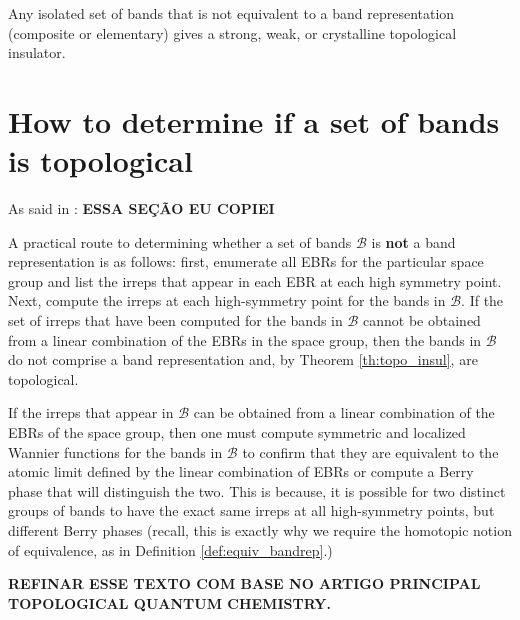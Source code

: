 \begin{theorem} \label{th:topo_insul}
Any isolated set of bands that is not equivalent to a band representation (composite or elementary) gives a strong, weak, or crystalline topological insulator.
\end{theorem}


\section{How to determine if a set of bands is topological}

As said in \cite{building_blocks2018}: \textbf{ESSA SEÇÃO EU COPIEI}

A practical route to determining whether a set of bands $\mathcal{B}$ is \textbf{not} a band representation is as follows: first, enumerate all EBRs for the particular space group and list the irreps that appear in each EBR at each high symmetry point. Next, compute the irreps at each high-symmetry point for the bands in $\mathcal{B}$. If the set of irreps that have been computed for the bands in $\mathcal{B}$ cannot be obtained from a linear combination of the EBRs in the space group, then the bands in $\mathcal{B}$ do not comprise a band representation and, by Theorem \ref{th:topo_insul}, are topological.

If the irreps that appear in $\mathcal{B}$ can be obtained from a linear combination of the EBRs of the space group, then one must compute symmetric and localized Wannier functions for the bands in $\mathcal{B}$ to confirm that they are equivalent to the atomic limit defined by the linear combination of EBRs or compute a Berry phase that will distinguish the two. This is because, it is possible for two distinct groups of bands to have the exact same irreps at all high-symmetry points, but different Berry phases (recall, this is exactly why we require the homotopic notion of equivalence, as in Definition \ref{def:equiv_bandrep}.)


\n\n

\textbf{REFINAR ESSE TEXTO COM BASE NO ARTIGO PRINCIPAL TOPOLOGICAL QUANTUM CHEMISTRY.}



%



